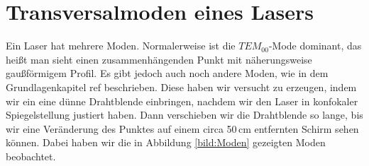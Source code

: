 \section{Transversalmoden eines Lasers}
\label{section:transvM}

Ein Laser hat mehrere Moden. Normalerweise ist die $TEM_{00}$-Mode dominant, das heißt man sieht einen zusammenhängenden 
Punkt mit näherungsweise gaußförmigem Profil. Es gibt jedoch auch noch andere Moden, wie in dem Grundlagenkapitel ref
beschrieben. Diese haben wir versucht zu erzeugen, indem wir ein eine dünne Drahtblende einbringen, nachdem wir den Laser in 
konfokaler Spiegelstellung justiert haben. Dann verschieben wir die Drahtblende so lange, bis wir eine Veränderung des Punktes auf einem circa 
50\,cm entfernten Schirm sehen können. Dabei haben wir die in Abbildung \ref{bild:Moden} gezeigten Moden beobachtet.
